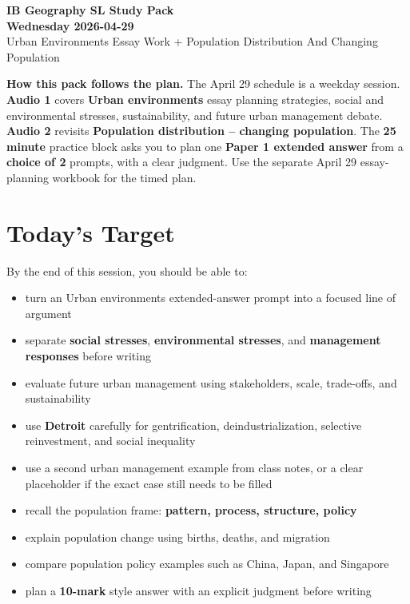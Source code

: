 \documentclass[11pt,a4paper]{article}
\newcommand{\term}[1]{\textcolor{HeadingBlue}{\textbf{#1}}}
\newcommand{\boxnote}[3]{%
\noindent\colorbox{#1}{%
  \begin{minipage}{0.965\textwidth}
  \sffamily
  \textbf{\textcolor{HeadingBlue}{#2}} #3
  \end{minipage}
}}
\begin{document}
\begin{center}
  {\sffamily\bfseries\color{HeadingBlue}\LARGE IB Geography SL Study Pack}\\[0.25em]
  {\sffamily\bfseries\color{AccentTeal}\Large Wednesday 2026-04-29}\\[0.35em]
  {\sffamily\color{TextInk}Urban Environments Essay Work + Population Distribution And Changing Population}
\end{center}

\vspace{0.5em}

\boxnote{SoftBlue}{How this pack follows the plan.}{The April 29 schedule is a
weekday session. \term{Audio 1} covers \term{Urban environments} essay planning
strategies, social and environmental stresses, sustainability, and future urban
management debate. \term{Audio 2} revisits \term{Population distribution --
changing population}. The \term{25 minute} practice block asks you to plan one
\term{Paper 1 extended answer} from a \term{choice of 2} prompts, with a clear
judgment. Use the separate April 29 essay-planning workbook for the timed plan.}

\section{Today's Target}

By the end of this session, you should be able to:

\begin{itemize}
  \item turn an Urban environments extended-answer prompt into a focused line of argument
  \item separate \term{social stresses}, \term{environmental stresses}, and
  \term{management responses} before writing
  \item evaluate future urban management using stakeholders, scale, trade-offs,
  and sustainability
  \item use \term{Detroit} carefully for gentrification, deindustrialization,
  selective reinvestment, and social inequality
  \item use a second urban management example from class notes, or a clear
  placeholder if the exact case still needs to be filled
  \item recall the population frame: \term{pattern, process, structure, policy}
  \item explain population change using births, deaths, and migration
  \item compare population policy examples such as China, Japan, and Singapore
  \item plan a \term{10-mark} style answer with an explicit judgment before writing
\end{itemize}
\end{document}
